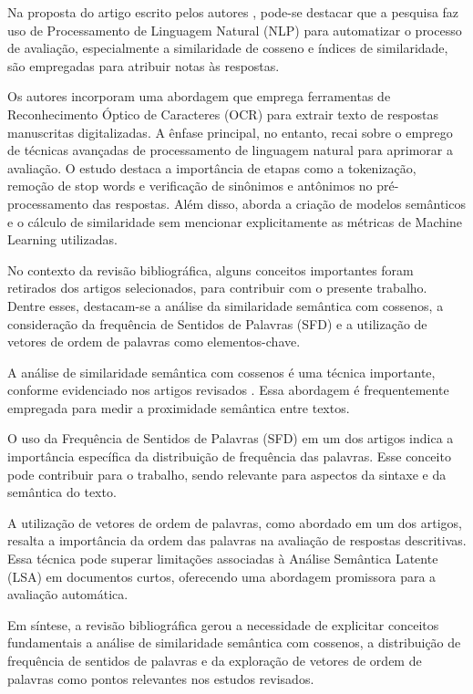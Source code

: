 Na proposta do artigo escrito pelos autores \cite{SemanticSimilarityBasedDescriptiveAnswerEvaluation}, pode-se destacar que a pesquisa faz uso de Processamento de Linguagem Natural (NLP) para automatizar o processo de avaliação, especialmente a similaridade de cosseno e índices de similaridade, são empregadas para atribuir notas às respostas.
    
Os autores \cite{StudyAutomatedEvaluationStudentsExaminationPaperMachineLearningTechniques} incorporam uma abordagem que emprega ferramentas de Reconhecimento Óptico de Caracteres (OCR) para extrair texto de respostas manuscritas digitalizadas. A ênfase principal, no entanto, recai sobre o emprego de técnicas avançadas de processamento de linguagem natural para aprimorar a avaliação. O estudo destaca a importância de etapas como a tokenização, remoção de stop words e verificação de sinônimos e antônimos no pré-processamento das respostas. Além disso, aborda a criação de modelos semânticos e o cálculo de similaridade sem mencionar explicitamente as métricas de Machine Learning utilizadas.



No contexto da revisão bibliográfica, alguns conceitos importantes foram retirados dos artigos selecionados, para contribuir com o presente trabalho. Dentre esses, destacam-se a análise da similaridade semântica com cossenos, a consideração da frequência de Sentidos de Palavras (SFD) e a utilização de vetores de ordem de palavras como elementos-chave.

A análise de similaridade semântica com cossenos é uma técnica importante, conforme evidenciado nos artigos revisados \cite{SemanticSimilarityBasedDescriptiveAnswerEvaluation}. Essa abordagem é frequentemente empregada para medir a proximidade semântica entre textos.

O uso da Frequência de Sentidos de Palavras (SFD) em um dos artigos indica a importância específica da distribuição de frequência das palavras. Esse conceito pode contribuir para o trabalho, sendo relevante para aspectos da sintaxe e da semântica do texto.

A utilização de vetores de ordem de palavras, como abordado em um dos artigos, resalta a importância da ordem das palavras na avaliação de respostas descritivas. Essa técnica pode superar limitações associadas à Análise Semântica Latente (LSA) em documentos curtos, oferecendo uma abordagem promissora para a avaliação automática.

Em síntese, a revisão bibliográfica gerou a necessidade de explicitar conceitos fundamentais a análise de similaridade semântica com cossenos, a distribuição de frequência de sentidos de palavras e da exploração de vetores de ordem de palavras como pontos relevantes nos estudos revisados.

\newpage
